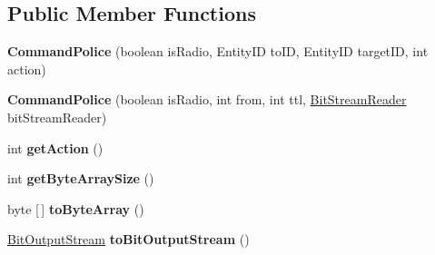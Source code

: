 \subsection*{Public Member Functions}
\begin{DoxyCompactItemize}
\item 
\hypertarget{classadf_1_1agent_1_1communication_1_1standard_1_1bundle_1_1topdown_1_1CommandPolice_aa8cda9c94c7876cbd37c15925411aa23}{}\label{classadf_1_1agent_1_1communication_1_1standard_1_1bundle_1_1topdown_1_1CommandPolice_aa8cda9c94c7876cbd37c15925411aa23} 
{\bfseries Command\+Police} (boolean is\+Radio, Entity\+ID to\+ID, Entity\+ID target\+ID, int action)
\item 
\hypertarget{classadf_1_1agent_1_1communication_1_1standard_1_1bundle_1_1topdown_1_1CommandPolice_afdeb2bff9db87a9436ffb6171a437a16}{}\label{classadf_1_1agent_1_1communication_1_1standard_1_1bundle_1_1topdown_1_1CommandPolice_afdeb2bff9db87a9436ffb6171a437a16} 
{\bfseries Command\+Police} (boolean is\+Radio, int from, int ttl, \hyperlink{classadf_1_1component_1_1communication_1_1util_1_1BitStreamReader}{Bit\+Stream\+Reader} bit\+Stream\+Reader)
\item 
\hypertarget{classadf_1_1agent_1_1communication_1_1standard_1_1bundle_1_1topdown_1_1CommandPolice_a7abd4a426513be758360db96ced6954a}{}\label{classadf_1_1agent_1_1communication_1_1standard_1_1bundle_1_1topdown_1_1CommandPolice_a7abd4a426513be758360db96ced6954a} 
int {\bfseries get\+Action} ()
\item 
\hypertarget{classadf_1_1agent_1_1communication_1_1standard_1_1bundle_1_1topdown_1_1CommandPolice_a3e547d0aee9c3f35fee95f9c7de9b70e}{}\label{classadf_1_1agent_1_1communication_1_1standard_1_1bundle_1_1topdown_1_1CommandPolice_a3e547d0aee9c3f35fee95f9c7de9b70e} 
int {\bfseries get\+Byte\+Array\+Size} ()
\item 
\hypertarget{classadf_1_1agent_1_1communication_1_1standard_1_1bundle_1_1topdown_1_1CommandPolice_a57f726945e1cf968a6c82433f8b39cf9}{}\label{classadf_1_1agent_1_1communication_1_1standard_1_1bundle_1_1topdown_1_1CommandPolice_a57f726945e1cf968a6c82433f8b39cf9} 
byte \mbox{[}$\,$\mbox{]} {\bfseries to\+Byte\+Array} ()
\item 
\hypertarget{classadf_1_1agent_1_1communication_1_1standard_1_1bundle_1_1topdown_1_1CommandPolice_a750351c36ad0e796ab59d528ef7a8e03}{}\label{classadf_1_1agent_1_1communication_1_1standard_1_1bundle_1_1topdown_1_1CommandPolice_a750351c36ad0e796ab59d528ef7a8e03} 
\hyperlink{classadf_1_1component_1_1communication_1_1util_1_1BitOutputStream}{Bit\+Output\+Stream} {\bfseries to\+Bit\+Output\+Stream} ()

\end{DoxyCompactItemize}
